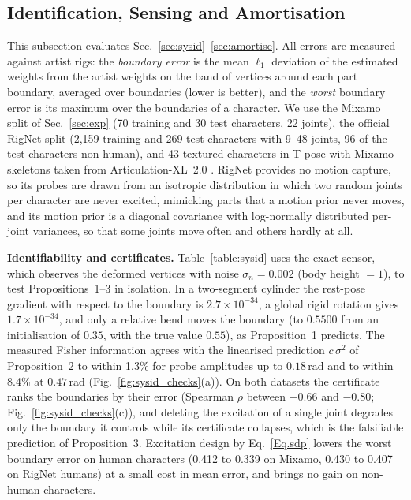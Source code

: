 \documentclass[lettersize,journal]{IEEEtran}
\newenvironment{revblock}{\par\color{red}}{\par}
\begin{document}
\begin{revblock}
\subsection{Identification, Sensing and Amortisation} \label{sec:exp_id}
This subsection evaluates Sec.~\ref{sec:sysid}--\ref{sec:amortise}. All errors are measured
against artist rigs: the \textit{boundary error} is the mean $\ell_{1}$ deviation of the
estimated weights from the artist weights on the band of vertices around each part boundary,
averaged over boundaries (lower is better), and the \textit{worst} boundary error is its
maximum over the boundaries of a character. We use the Mixamo split of Sec.~\ref{sec:exp}
(70 training and 30 test characters, 22 joints), the official RigNet split (2,159 training and
269 test characters with 9--48 joints, 96 of the test characters non-human), and 43 textured
characters in T-pose with Mixamo skeletons taken from Articulation-XL~2.0
\cite{song2025magicarticulate}. RigNet provides no motion capture, so its probes are drawn from an
isotropic distribution in which two random joints per character are never excited, mimicking
parts that a motion prior never moves, and its motion prior is a diagonal covariance with
log-normally distributed per-joint variances, so that some joints move often and others hardly
at all.

\textbf{Identifiability and certificates.} Table~\ref{table:sysid} uses the exact sensor, which
observes the deformed vertices with noise $\sigma_{n}=0.002$ (body height $=1$), to test
Propositions~1--3 in isolation. In a two-segment cylinder the rest-pose gradient with respect to
the boundary is $2.7\times10^{-34}$, a global rigid rotation gives $1.7\times10^{-34}$, and only a
relative bend moves the boundary (to $0.5500$ from an initialisation of $0.35$, with the true
value $0.55$), as Proposition~1 predicts. The measured Fisher information agrees with the
linearised prediction $c\,\sigma^{2}$ of Proposition~2 to within 1.3\% for probe amplitudes up to
$0.18$\,rad and to within 8.4\% at $0.47$\,rad (Fig.~\ref{fig:sysid_checks}(a)). On both datasets the certificate ranks the
boundaries by their error (Spearman $\rho$ between $-0.66$ and $-0.80$; Fig.~\ref{fig:sysid_checks}(c)), and deleting the
excitation of a single joint degrades only the boundary it controls while its certificate
collapses, which is the falsifiable prediction of Proposition~3. Excitation design by
Eq.~\ref{Eq.sdp} lowers the worst boundary error on human characters (0.412 to 0.339 on Mixamo,
0.430 to 0.407 on RigNet humans) at a small cost in mean error, and brings no gain on non-human
characters.
\end{revblock}
\end{document}
